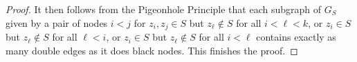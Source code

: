 \documentclass[11pt]{article}
\theoremstyle{definition}
\numberwithin{equation}{section}
\begin{document}
\begin{proof}
It then follows from the Pigeonhole Principle that each subgraph of $G_S$ given by a pair of nodes $i<j$ for $z_i,z_j\in S$ but $z_\ell\notin S$ for all $i<\ell<k$, or $z_i\in S$ but $z_\ell\notin S$ for all $\ell < i$, or $z_i \in S$ but $z_\ell\notin S$ for all $i <\ell$ contains exactly as many double edges as it does black nodes. 
This finishes the proof. 
% 
% 
% 
% 

\end{proof}
\end{document}
